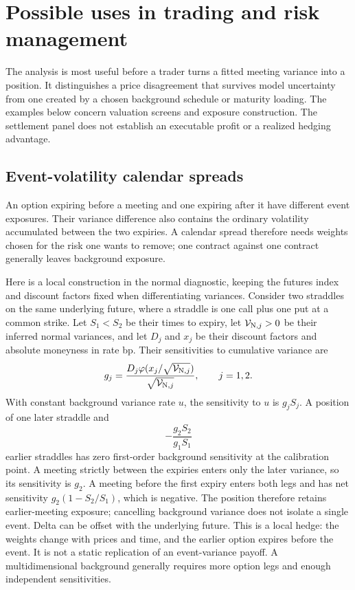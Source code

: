 \section{Possible uses in trading and risk management}\label{sec:uses}
The analysis is most useful before a trader turns a fitted meeting variance into a position. It distinguishes a price disagreement that survives model uncertainty from one created by a chosen background schedule or maturity loading. The examples below concern valuation screens and exposure construction. The settlement panel does not establish an executable profit or a realized hedging advantage.

\subsection{Event-volatility calendar spreads}
An option expiring before a meeting and one expiring after it have different event exposures. Their variance difference also contains the ordinary volatility accumulated between the two expiries. A calendar spread therefore needs weights chosen for the risk one wants to remove; one contract against one contract generally leaves background exposure.

Here is a local construction in the normal diagnostic, keeping the futures index and discount factors fixed when differentiating variances. Consider two straddles on the same underlying future, where a straddle is one call plus one put at a common strike. Let $S_1<S_2$ be their times to expiry, let $\mathcal V_{\mathrm N,j}>0$ be their inferred normal variances, and let $D_j$ and $x_j$ be their discount factors and absolute moneyness in rate bp. Their sensitivities to cumulative variance are
\[
g_j=\frac{D_j\varphi(x_j/\sqrt{\mathcal V_{\mathrm N,j}})}{\sqrt{\mathcal V_{\mathrm N,j}}},\qquad j=1,2.
\]
With constant background variance rate $u$, the sensitivity to $u$ is $g_jS_j$. A position of one later straddle and
\begin{equation}\label{eq:calendarhedge}
-\frac{g_2S_2}{g_1S_1}
\end{equation}
earlier straddles has zero first-order background sensitivity at the calibration point. A meeting strictly between the expiries enters only the later variance, so its sensitivity is $g_2$. A meeting before the first expiry enters both legs and has net sensitivity $g_2(1-S_2/S_1)$, which is negative. The position therefore retains earlier-meeting exposure; cancelling background variance does not isolate a single event. Delta can be offset with the underlying future. This is a local hedge: the weights change with prices and time, and the earlier option expires before the event. It is not a static replication of an event-variance payoff. A multidimensional background generally requires more option legs and enough independent sensitivities.

